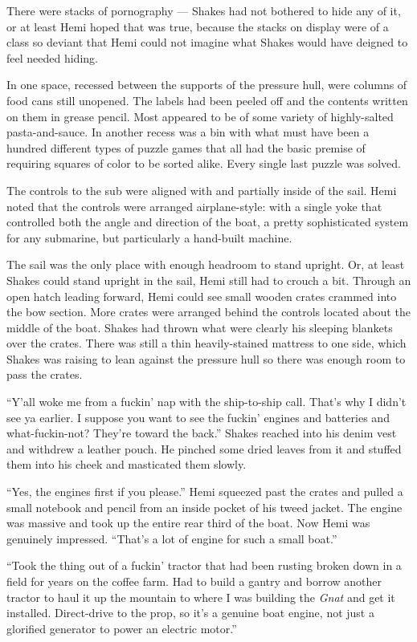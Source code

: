 \documentclass[]{scrbook}
\begin{document}
There were stacks of pornography --- Shakes had not bothered to hide any
of it, or at least Hemi hoped that was true, because the stacks on
display were of a class so deviant that Hemi could not imagine what
Shakes would have deigned to feel needed hiding.

In one space, recessed between the supports of the pressure hull, were
columns of food cans still unopened. The labels had been peeled off and
the contents written on them in grease pencil. Most appeared to be of
some variety of highly-salted pasta-and-sauce. In another recess was a
bin with what must have been a hundred different types of puzzle games
that all had the basic premise of requiring squares of color to be
sorted alike. Every single last puzzle was solved.

The controls to the sub were aligned with and partially inside of the
sail. Hemi noted that the controls were arranged airplane-style: with a
single yoke that controlled both the angle and direction of the boat, a
pretty sophisticated system for any submarine, but particularly a
hand-built machine.

The sail was the only place with enough headroom to stand upright. Or,
at least Shakes could stand upright in the sail, Hemi still had to
crouch a bit. Through an open hatch leading forward, Hemi could see
small wooden crates crammed into the bow section. More crates were
arranged behind the controls located about the middle of the boat.
Shakes had thrown what were clearly his sleeping blankets over the
crates. There was still a thin heavily-stained mattress to one side,
which Shakes was raising to lean against the pressure hull so there was
enough room to pass the crates.

``Y'all woke me from a fuckin' nap with the ship-to-ship call. That's
why I didn't see ya earlier. I suppose you want to see the fuckin'
engines and batteries and what-fuckin-not? They're toward the back.''
Shakes reached into his denim vest and withdrew a leather pouch. He
pinched some dried leaves from it and stuffed them into his cheek and
masticated them slowly.

``Yes, the engines first if you please.'' Hemi squeezed past the crates
and pulled a small notebook and pencil from an inside pocket of his
tweed jacket. The engine was massive and took up the entire rear third
of the boat. Now Hemi was genuinely impressed. ``That's a lot of engine
for such a small boat.''

``Took the thing out of a fuckin' tractor that had been rusting broken
down in a field for years on the coffee farm. Had to build a gantry and
borrow another tractor to haul it up the mountain to where I was
building the \emph{Gnat} and get it installed. Direct-drive to the prop,
so it's a genuine boat engine, not just a glorified generator to power
an electric motor.''
\end{document}
